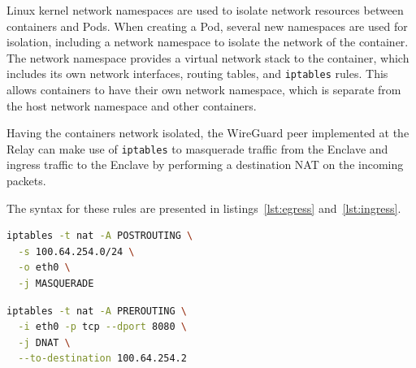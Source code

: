 \documentclass[a4paper, twocolumn]{article}
\begin{document}
Linux kernel network namespaces are used to isolate network resources between
containers and Pods. When creating a Pod, several new namespaces are used for
isolation, including a network namespace to isolate the network of the
container. The network namespace provides a virtual network stack to the
container, which includes its own network interfaces, routing tables, and
\texttt{iptables} rules. This allows containers to have their own network namespace,
which is separate from the host network namespace and other containers.

Having the containers network isolated, the WireGuard peer implemented at the
Relay can make use of \texttt{iptables} to masquerade traffic from the Enclave and
ingress traffic to the Enclave by performing a destination NAT on the incoming
packets.

The syntax for these rules are presented in listings~\ref{lst:egress}
and~\ref{lst:ingress}.

\begin{minipage}{\linewidth}
\begin{lstlisting}[language=bash,caption={Enclave Egress},label={lst:egress}]
iptables -t nat -A POSTROUTING \
  -s 100.64.254.0/24 \
  -o eth0 \
  -j MASQUERADE
\end{lstlisting}
\end{minipage}

\begin{minipage}{\linewidth}
\begin{lstlisting}[language=bash,caption={Enclave Ingress},label={lst:ingress}]
iptables -t nat -A PREROUTING \
  -i eth0 -p tcp --dport 8080 \
  -j DNAT \
  --to-destination 100.64.254.2
\end{lstlisting}
\end{minipage}
\end{document}

